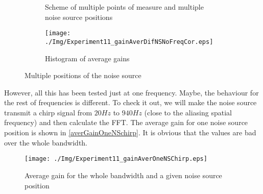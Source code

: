 \begin{figure}
	\centering
	\begin{subfigure}[b]{0.49\textwidth}
	\centering
	\caption[Scheme of multiple points of measure and multiple noise source positions]{Scheme of multiple points of measure and multiple noise source positions}
	\label{MultRecMultNSscheme}
	\end{subfigure}
	\begin{subfigure}[b]{0.49\textwidth}
		\centering
		\texttt{[image: ./Img/Experiment11\_gainAverDifNSNoFreqCor.eps]}
		\caption{Histogram of average gains}
		\label{histogramDifNSNoFreqCorrAverGain}
	\end{subfigure}
	\caption{Multiple positions of the noise source}
\end{figure}

However, all this has been tested just at one frequency. Maybe, the behaviour for the rest of frequencies is different. To check it out, we will make the noise source transmit a chirp signal from $20 \si{Hz}$ to $940 \si{Hz}$ (close to the aliasing spatial frequency) and then calculate the FFT. The average gain for one noise source position is shown in \autoref{averGainOneNSchirp}.
It is obvious that the values are bad over the whole bandwidth.

\begin{figure}[h]
	\centering
	\texttt{[image: ./Img/Experiment11\_gainAverOneNSChirp.eps]}
	\caption{Average gain for the whole bandwidth and a given noise source position}
	\label{averGainOneNSchirp}
\end{figure}


